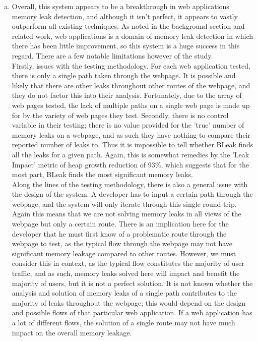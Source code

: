 \documentclass[12pt]{article}
\begin{document}
\begin{enumerate}[(a)]
    \item Overall, this system appears to be a breakthrough in web applications memory leak detection, and although it isn't perfect, it appears to vastly outperform all existing techniques. As noted in the background section and related work, web applications is a domain of memory leak detection in which there has been little improvement, so this system is a huge success in this regard. There are a few notable limitations however of the study. \\\newline
    Firstly, issues with the testing methodology. For each web application tested, there is only a single path taken through the webpage. It is possible and likely that there are other leaks throughout other routes of the webpage, and they do not factor this into their analysis. Fortunately, due to the array of web pages tested, the lack of multiple paths on a single web page is made up for by the variety of web pages they test. Secondly, there is no control variable in their testing; there is no value provided for the 'true' number of memory leaks on a webpage, and as such they have nothing to compare their reported number of leaks to. Thus it is impossible to tell whether BLeak finds all the leaks for a given path. Again, this is somewhat remedies by the 'Leak Impact' metric of heap growth reduction of 93\%, which suggests that for the most part, BLeak finds the most significant memory leaks. \\\newline
    Along the lines of the testing methodology, there is also a general issue with the design of the system. A developer has to input a certain path through the webpage, and the system will only iterate through this single round-trip. Again this means that we are not solving memory leaks in all views of the webpage but only a certain route. There is an implication here for the developer that he must first know of a problematic route through the webpage to test, as the typical flow through the webpage may not have significant memory leakage compared to other routes. However, we must consider this in context, as the typical flow constitutes the majority of user traffic, and as such, memory leaks solved here will impact and benefit the majority of users, but it is not a perfect solution. It is not known whether the analysis and solution of memory leaks of a single path contributes to the majority of leaks throughout the webpage; this would depend on the design and possible flows of that particular web application. If a web application has a lot of different flows, the solution of a single route may not have much impact on the overall memory leakage. \\\newline

\end{enumerate}
\end{document}
